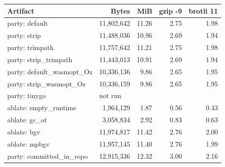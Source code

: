 \begin{tabular}{lrrrr}
\hline
Artifact & Bytes & MiB & gzip -9 & brotli 11 \\
\hline
party: default & 11,802,642 & 11.26 & 2.75 & 1.98 \\
party: strip & 11,488,036 & 10.96 & 2.69 & 1.94 \\
party: trimpath & 11,757,642 & 11.21 & 2.75 & 1.98 \\
party: strip\_trimpath & 11,443,013 & 10.91 & 2.69 & 1.94 \\
party: default\_wasmopt\_Oz & 10,336,136 & 9.86 & 2.65 & 1.95 \\
party: strip\_wasmopt\_Oz & 10,336,159 & 9.86 & 2.65 & 1.95 \\
party: tinygo & \multicolumn{4}{l}{not run} \\
ablate: empty\_runtime & 1,964,129 & 1.87 & 0.56 & 0.43 \\
ablate: gc\_ot & 3,058,834 & 2.92 & 0.83 & 0.63 \\
ablate: bgv & 11,974,817 & 11.42 & 2.76 & 2.00 \\
ablate: mpbgv & 11,957,145 & 11.40 & 2.76 & 1.99 \\
party: committed\_in\_repo & 12,915,336 & 12.32 & 3.00 & 2.16 \\
\hline
\end{tabular}
